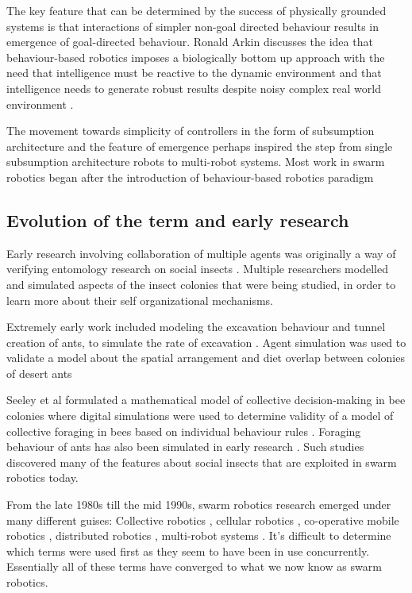 The key feature that can be determined by the success of physically grounded systems is that interactions of simpler non-goal directed behaviour results in emergence of goal-directed behaviour. Ronald Arkin discusses the idea that behaviour-based robotics imposes a biologically bottom up approach with the need that intelligence must be reactive to the dynamic environment and that intelligence needs to generate robust results despite noisy complex real world environment \cite{arkin1990integrating}.

The movement towards simplicity of controllers in the form of subsumption architecture and the feature of emergence perhaps inspired the step from single subsumption architecture robots to multi-robot systems. Most work in swarm robotics began after the introduction of behaviour-based robotics paradigm \cite{arai2002editorial}

\subsection{Evolution of the term and early research}
\label{early-research}

Early research involving collaboration of multiple agents was originally a way of verifying entomology research on social insects \cite{dorigo2014swarm, beni1993swarm, seeley2009wisdom}. Multiple researchers modelled and simulated aspects of the insect colonies that were being studied, in order to learn more about their self organizational mechanisms. 

Extremely early work included modeling the excavation behaviour and tunnel creation of ants, to simulate the rate of excavation \cite{sudd1975model}. Agent simulation was used to validate a model about the spatial arrangement and diet overlap between colonies of desert ants \cite{ryti1984spatial} 

Seeley et al \cite{seeley1991collective} formulated a mathematical model of collective decision-making in bee colonies where digital simulations were used to determine validity of a model of collective foraging in bees based on individual behaviour rules \cite{de1998modelling}. Foraging behaviour of ants has also been simulated in early research \cite{lopez1987optimal}. Such studies discovered many of the features about social insects that are exploited in swarm robotics today.

From the late 1980s till the mid 1990s, swarm robotics research emerged under many different guises: Collective robotics \cite{kube1993collective}, cellular robotics \cite{freund1984design}, co-operative mobile robotics \cite{cao1997cooperative}, distributed robotics \cite{asama2013distributed}, multi-robot systems \cite{mataric1995cooperative}. It's difficult to determine which terms were used first as they seem to have been in use concurrently. Essentially all of these terms have converged to what we now know as swarm robotics.

